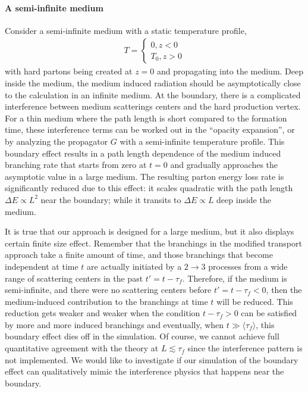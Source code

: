 \paragraph{A semi-infinite medium}
Consider a semi-infinite medium with a static temperature profile,
\begin{eqnarray}
T = \begin{cases}
0 , z<0\\
T_0, z>0
\end{cases}
\end{eqnarray}
with hard partons being created at $z=0$ and propagating into the medium.
Deep inside the medium, the medium induced radiation should be asymptotically close to the calculation in an infinite medium.
At the boundary, there is a complicated interference between medium scatterings centers and the hard production vertex.
For a thin medium where the path length is short compared to the formation time, these interference terms can be worked out in the ``opacity expansion'', or by analyzing the propagator $G$ with a semi-infinite temperature profile.
This boundary effect results in a path length dependence of the medium induced branching rate that starts from zero at $t=0$ and gradually approaches the asymptotic value in a large medium.
The resulting parton energy loss rate is significantly reduced due to this effect: it scales quadratic with the path length $\Delta E \propto L^2$ near the boundary; while it transits to $\Delta E \propto L$ deep inside the medium.

It is true that our approach is designed for a large medium, but it also displays certain finite size effect. 
Remember that the branchings in the modified transport approach take a finite amount of time, and those branchings that become independent at time $t$ are actually initiated by a $2\rightarrow 3$ processes from a wide range of scattering centers in the past $t' = t - \tau_f$.
Therefore, if the medium is semi-infinite, and there were no scattering centers before $t' = t-\tau_f < 0$, then the medium-induced contribution to the branchings at time $t$ will be reduced.
This reduction gets weaker and weaker when the condition $t-\tau_f > 0$ can be satisfied by more and more induced branchings and eventually, when $t\gg \langle \tau_f\rangle$, this boundary effect dies off in the simulation. 
Of course, we cannot achieve full quantitative agreement with the theory at $L \lesssim \tau_f$ since the interference pattern is not implemented.
We would like to investigate if our simulation of the boundary effect can qualitatively mimic the interference physics that happens near the boundary.

